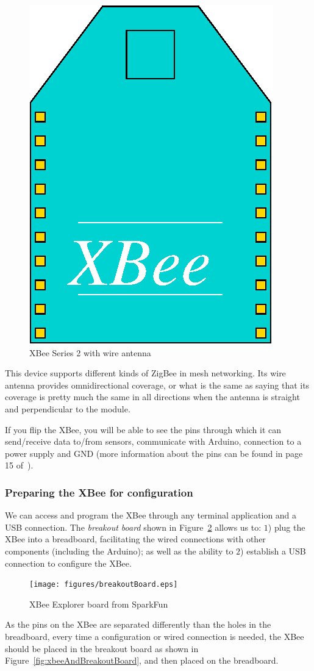 \begin{figure}[htbp]
  \centering
  \includegraphics[width=0.4\linewidth]{figures/xbee.eps}
  \caption{XBee Series 2 with wire antenna
  \label{fig:xbee}}
\end{figure}

This device supports different kinds of ZigBee in mesh networking. Its wire antenna provides omnidirectional coverage, or what is the same as saying that its coverage is pretty much the same in all directions when the antenna is straight and perpendicular to the module.

If you flip the XBee, you will be able to see the pins through which it can send/receive data to/from sensors, communicate with Arduino, connection to a power supply and GND (more information about the pins can be found in page 15 of~\cite{faludi2010bws}).

\subsubsection{Preparing the XBee for configuration}

We can access and program the XBee through any terminal application and a USB connection. The \emph{breakout board} shown in Figure~\ref{fig:breakoutBoard} allows us to: $1$) plug the XBee into a breadboard, facilitating the wired connections with other components (including the Arduino); as well as the ability to $2$) establish a USB connection to configure the XBee.

\begin{figure}[htbp]
  \centering
  \texttt{[image: figures/breakoutBoard.eps]}
  \caption{XBee Explorer board from SparkFun
  \label{fig:breakoutBoard}}
\end{figure}

As the pins on the XBee are separated differently than the holes in the breadboard, every time a configuration or wired connection is needed, the XBee should be placed in the breakout board as shown in Figure~\ref{fig:xbeeAndBreakoutBoard}, and then placed on the breadboard.


